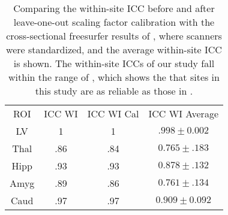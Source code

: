 \begin{table} 
    \begin{tabular}{ c c c c }
        ROI & ICC WI & ICC WI Cal & \cite{jovicich2013brain} ICC WI Average \\ 
        LV & 1 & 1 & $.998 \pm 0.002$ \\ 
        Thal & .86 & .84 & $0.765 \pm .183$ \\ 
        Hipp & .93 & .93 & $0.878 \pm .132$ \\ 
        Amyg & .89 & .86 & $0.761 \pm .134$ \\ 
        Caud & .97 & .97 & $0.909 \pm 0.092$ \\ 
    \end{tabular} 
    \caption{Comparing the within-site ICC before and after leave-one-out scaling factor calibration with the cross-sectional freesurfer results of \cite{jovicich2013brain}, where scanners were standardized, and the average within-site ICC is shown. The within-site ICCs of our study fall within the range of \cite{jovicich2013brain}, which shows the that sites in this study are as reliable as those in \cite{jovicich2013brain}.} 
\end{table}
